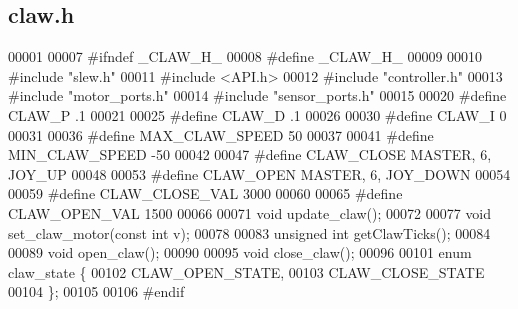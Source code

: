 \subsection{claw.\+h}
\label{claw_8h_source}

\begin{DoxyCode}
00001 
00007 \textcolor{preprocessor}{#ifndef \_CLAW\_H\_}
00008 \textcolor{preprocessor}{#define \_CLAW\_H\_}
00009 
00010 \textcolor{preprocessor}{#include "slew.h"}
00011 \textcolor{preprocessor}{#include <API.h>}
00012 \textcolor{preprocessor}{#include "controller.h"}
00013 \textcolor{preprocessor}{#include "motor_ports.h"}
00014 \textcolor{preprocessor}{#include "sensor_ports.h"}
00015 
00020 \textcolor{preprocessor}{#define CLAW\_P .1}
00021 
00025 \textcolor{preprocessor}{#define CLAW\_D .1}
00026 
00030 \textcolor{preprocessor}{#define CLAW\_I 0}
00031 
00036 \textcolor{preprocessor}{#define MAX\_CLAW\_SPEED 50}
00037 
00041 \textcolor{preprocessor}{#define MIN\_CLAW\_SPEED -50}
00042 
00047 \textcolor{preprocessor}{#define CLAW\_CLOSE MASTER, 6, JOY\_UP}
00048 
00053 \textcolor{preprocessor}{#define CLAW\_OPEN MASTER, 6, JOY\_DOWN}
00054 
00059 \textcolor{preprocessor}{#define CLAW\_CLOSE\_VAL 3000}
00060 
00065 \textcolor{preprocessor}{#define CLAW\_OPEN\_VAL 1500}
00066 
00071 \textcolor{keywordtype}{void} update_claw();
00072 
00077 \textcolor{keywordtype}{void} set_claw_motor(\textcolor{keyword}{const} \textcolor{keywordtype}{int} v);
00078 
00083 \textcolor{keywordtype}{unsigned} \textcolor{keywordtype}{int} getClawTicks();
00084 
00089 \textcolor{keywordtype}{void} open_claw();
00090 
00095 \textcolor{keywordtype}{void} close_claw();
00096 
00101 \textcolor{keyword}{enum} claw_state \{
00102   CLAW_OPEN_STATE,
00103   CLAW_CLOSE_STATE
00104 \};
00105 
00106 \textcolor{preprocessor}{#endif}
\end{DoxyCode}
